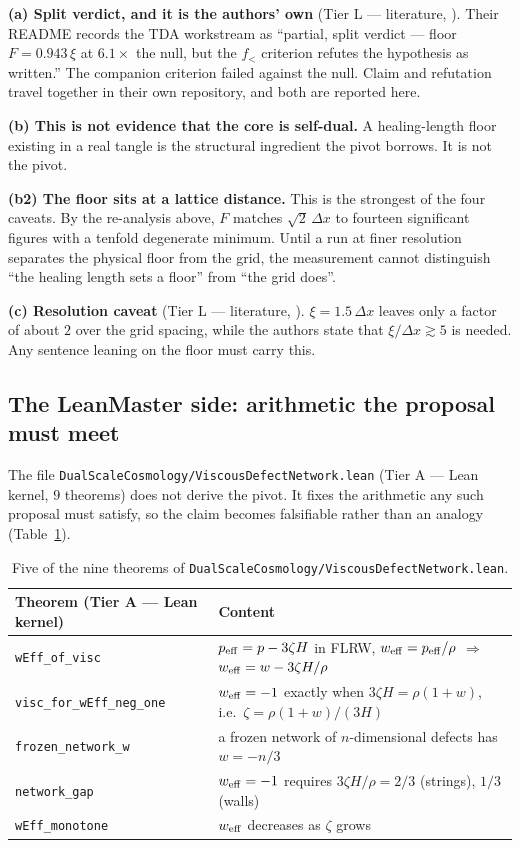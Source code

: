 \documentclass[11pt,a4paper]{article}
\theoremstyle{remark}
\newcommand{\tierA}{\colorbox{green!15}{\textsf{\scriptsize Tier A --- Lean kernel}}}
\newcommand{\tierL}{\colorbox{blue!10}{\textsf{\scriptsize Tier L --- literature}}}
\newcommand{\lean}[1]{\texttt{#1}}
\begin{document}
\begin{scopebox}
\textbf{(a) Split verdict, and it is the authors' own} (\tierL, \cite{QuantumFluids2026}). Their README records the TDA workstream as ``partial, split verdict --- floor $F = 0.943\,\xi$ at $6.1\times$ the null, but the $f_<$ criterion refutes the hypothesis as written.'' The companion criterion failed against the null. Claim and refutation travel together in their own repository, and both are reported here.

\textbf{(b) This is not evidence that the core is self-dual.} A healing-length floor existing in a real tangle is the structural ingredient the pivot borrows. It is not the pivot.

\textbf{(b2) The floor sits at a lattice distance.} This is the strongest of the four caveats. By the re-analysis above, $F$ matches $\sqrt{2}\,\Delta x$ to fourteen significant figures with a tenfold degenerate minimum. Until a run at finer resolution separates the physical floor from the grid, the measurement cannot distinguish ``the healing length sets a floor'' from ``the grid does''.

\textbf{(c) Resolution caveat} (\tierL, \cite{QuantumFluids2026}). $\xi = 1.5\,\Delta x$ leaves only a factor of about $2$ over the grid spacing, while the authors state that $\xi/\Delta x \gtrsim 5$ is needed. Any sentence leaning on the floor must carry this.
\end{scopebox}

\subsection*{The LeanMaster side: arithmetic the proposal must meet}

The file \lean{DualScaleCosmology/ViscousDefectNetwork.lean} (\tierA, $9$ theorems) does not derive the pivot. It fixes the arithmetic any such proposal must satisfy, so the claim becomes falsifiable rather than an analogy (Table~\ref{tab:visc}).

\begin{table}[h]
\centering
\begin{tabular}{ll}
\hline
Theorem (\tierA) & Content \\
\hline
\lean{wEff\_of\_visc} & $p_{\rm eff} = p - 3\zeta H$ in FLRW, $w_{\rm eff} = p_{\rm eff}/\rho$ $\Rightarrow$ $w_{\rm eff} = w - 3\zeta H/\rho$ \\
\lean{visc\_for\_wEff\_neg\_one} & $w_{\rm eff} = -1$ exactly when $3\zeta H = \rho(1+w)$, i.e.\ $\zeta = \rho(1+w)/(3H)$ \\
\lean{frozen\_network\_w} & a frozen network of $n$-dimensional defects has $w = -n/3$ \\
\lean{network\_gap} & $w_{\rm eff} = -1$ requires $3\zeta H/\rho = 2/3$ (strings), $1/3$ (walls) \\
\lean{wEff\_monotone} & $w_{\rm eff}$ decreases as $\zeta$ grows \\
\hline
\end{tabular}
\caption{Five of the nine theorems of \lean{DualScaleCosmology/ViscousDefectNetwork.lean}.}
\label{tab:visc}
\end{table}
\end{document}
